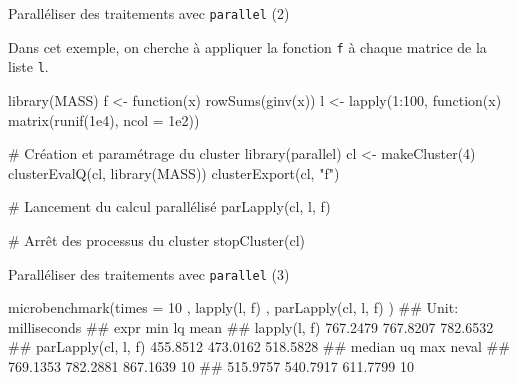 \documentclass[12pt,ignorenonframetext,]{beamer}
\newenvironment{Shaded}{}{}
\newcommand{\CommentTok}[1]{\textcolor[rgb]{0.00,0.50,0.00}{#1}}
\newcommand{\ControlFlowTok}[1]{\textcolor[rgb]{0.00,0.00,1.00}{#1}}
\newcommand{\DataTypeTok}[1]{#1}
\newcommand{\DecValTok}[1]{#1}
\newcommand{\FloatTok}[1]{#1}
\newcommand{\KeywordTok}[1]{\textcolor[rgb]{0.00,0.00,1.00}{#1}}
\newcommand{\NormalTok}[1]{#1}
\newcommand{\OperatorTok}[1]{#1}
\newcommand{\StringTok}[1]{\textcolor[rgb]{0.00,0.50,0.50}{#1}}
\renewenvironment{Shaded}{\begin{snugshade}}{\end{snugshade}}
\begin{document}
\begin{frame}[fragile]{\large Paralléliser des traitements avec
\texttt{parallel} (2)}
\protect\hypertarget{paralleliser-des-traitements-avec-parallel-2}{}

Dans cet exemple, on cherche à appliquer la fonction \texttt{f} à chaque
matrice de la liste \texttt{l}.

\pause \footnotesize

\begin{Shaded}
\begin{Highlighting}[]
\KeywordTok{library}\NormalTok{(MASS)}
\NormalTok{f <-}\StringTok{ }\ControlFlowTok{function}\NormalTok{(x) }\KeywordTok{rowSums}\NormalTok{(}\KeywordTok{ginv}\NormalTok{(x))}
\NormalTok{l <-}\StringTok{ }\KeywordTok{lapply}\NormalTok{(}\DecValTok{1}\OperatorTok{:}\DecValTok{100}\NormalTok{, }\ControlFlowTok{function}\NormalTok{(x) }\KeywordTok{matrix}\NormalTok{(}\KeywordTok{runif}\NormalTok{(}\FloatTok{1e4}\NormalTok{), }\DataTypeTok{ncol =} \FloatTok{1e2}\NormalTok{))}

\CommentTok{# Création et paramétrage du cluster}
\KeywordTok{library}\NormalTok{(parallel)}
\NormalTok{cl <-}\StringTok{ }\KeywordTok{makeCluster}\NormalTok{(}\DecValTok{4}\NormalTok{)}
\KeywordTok{clusterEvalQ}\NormalTok{(cl, }\KeywordTok{library}\NormalTok{(MASS))}
\KeywordTok{clusterExport}\NormalTok{(cl, }\StringTok{"f"}\NormalTok{)}

\CommentTok{# Lancement du calcul parallélisé}
\KeywordTok{parLapply}\NormalTok{(cl, l, f)}

\CommentTok{# Arrêt des processus du cluster}
\KeywordTok{stopCluster}\NormalTok{(cl)}
\end{Highlighting}
\end{Shaded}

\end{frame}

\begin{frame}[fragile]{\large Paralléliser des traitements avec
\texttt{parallel} (3)}
\protect\hypertarget{paralleliser-des-traitements-avec-parallel-3}{}

\pause

\begin{Shaded}
\begin{Highlighting}[]
\KeywordTok{microbenchmark}\NormalTok{(}\DataTypeTok{times =} \DecValTok{10}
\NormalTok{  , }\KeywordTok{lapply}\NormalTok{(l, f)}
\NormalTok{  , }\KeywordTok{parLapply}\NormalTok{(cl, l, f)}
\NormalTok{)}
\NormalTok{  ## Unit: milliseconds}
\NormalTok{  ##                 expr      min       lq     mean}
\NormalTok{  ##         lapply(l, f) 767.2479 767.8207 782.6532}
\NormalTok{  ##  parLapply(cl, l, f) 455.8512 473.0162 518.5828}
\NormalTok{  ##    median       uq      max neval}
\NormalTok{  ##  769.1353 782.2881 867.1639    10}
\NormalTok{  ##  515.9757 540.7917 611.7799    10}
\end{Highlighting}
\end{Shaded}

\pause

\end{frame}
\end{document}
